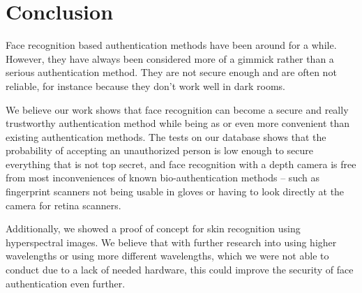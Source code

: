 \chapter{Conclusion}
    Face recognition based authentication methods have been around for a while. However,
    they have always been considered more of a gimmick rather than a serious
    authentication method. They are not secure enough and are often not reliable,
    for instance because they don't work well in dark rooms.

    We believe our work shows that face recognition can become a secure and
    really trustworthy authentication method while being as or even more
    convenient than existing authentication methods.
    The tests on our database shows that the probability of accepting
    an unauthorized person is low enough to secure everything that is not top secret,
    and face recognition with a depth camera is free from most inconveniences
    of known bio-authentication methods -- such as fingerprint scanners not
    being usable in gloves or having to look directly at the camera for
    retina scanners.

    Additionally, we showed a proof of concept for skin recognition using
    hyperspectral images. We believe that with further research into
    using higher wavelengths or using more different wavelengths,
    which we were not able to conduct due to a lack of needed hardware,
    this could improve the security of face authentication even further.
